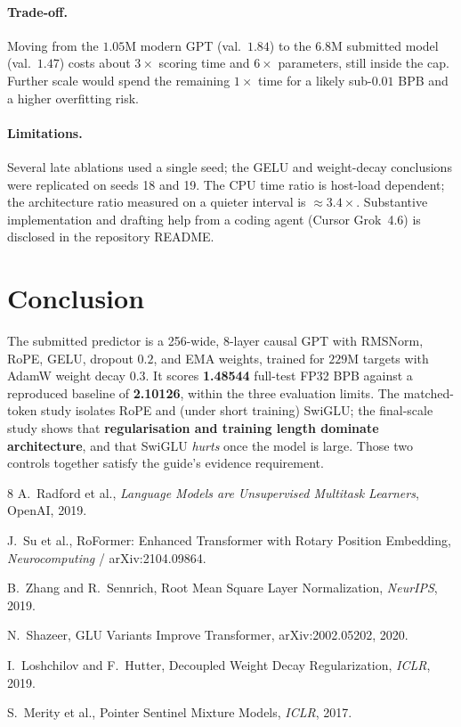 \documentclass[11pt,a4paper]{article}
\begin{document}
\paragraph{Trade-off.}
Moving from the $1.05$M modern GPT (val.\ $1.84$) to the $6.8$M submitted model (val.\ $1.47$) costs about $3\times$ scoring time and $6\times$ parameters, still inside the cap. Further scale would spend the remaining $1\times$ time for a likely sub-$0.01$ BPB and a higher overfitting risk.

\paragraph{Limitations.}
Several late ablations used a single seed; the GELU and weight-decay conclusions were replicated on seeds 18 and 19. The CPU time ratio is host-load dependent; the architecture ratio measured on a quieter interval is $\approx 3.4\times$. Substantive implementation and drafting help from a coding agent (Cursor Grok~4.6) is disclosed in the repository README.

\section{Conclusion}

The submitted predictor is a 256-wide, 8-layer causal GPT with RMSNorm, RoPE, GELU, dropout $0.2$, and EMA weights, trained for $229$M targets with AdamW weight decay $0.3$. It scores \textbf{1.48544} full-test FP32 BPB against a reproduced baseline of \textbf{2.10126}, within the three evaluation limits. The matched-token study isolates RoPE and (under short training) SwiGLU; the final-scale study shows that \textbf{regularisation and training length dominate architecture}, and that SwiGLU \emph{hurts} once the model is large. Those two controls together satisfy the guide's evidence requirement.

\begin{thebibliography}{8}
A.~Radford et al., \emph{Language Models are Unsupervised Multitask Learners}, OpenAI, 2019.

J.~Su et al., RoFormer: Enhanced Transformer with Rotary Position Embedding, \emph{Neurocomputing} / arXiv:2104.09864.

B.~Zhang and R.~Sennrich, Root Mean Square Layer Normalization, \emph{NeurIPS}, 2019.

N.~Shazeer, GLU Variants Improve Transformer, arXiv:2002.05202, 2020.

I.~Loshchilov and F.~Hutter, Decoupled Weight Decay Regularization, \emph{ICLR}, 2019.

S.~Merity et al., Pointer Sentinel Mixture Models, \emph{ICLR}, 2017.

\end{thebibliography}
\end{document}
